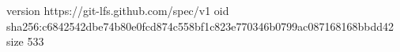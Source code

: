 version https://git-lfs.github.com/spec/v1
oid sha256:c6842542dbe74b80e0fcd874c558bf1c823e770346b0799ac087168168bbdd42
size 533
